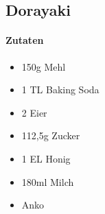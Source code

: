 \newpage
\subsection{Dorayaki}
\paragraph{Zutaten}
\begin{itemize}[noitemsep]
	\item 150g Mehl
	\item 1 TL Baking Soda
	\item 2 Eier
	\item 112,5g Zucker 
	\item 1 EL Honig
	\item 180ml Milch
	\item Anko
\end{itemize}

